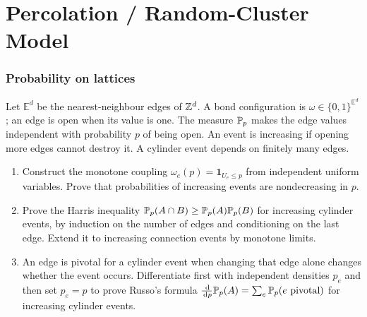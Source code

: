\part{Percolation / Random-Cluster Model}

\section{Probability on lattices}

\begin{exercise}
Let $\mathbb E^d$ be the nearest-neighbour edges of $\mathbb Z^d$.
A bond configuration is $\omega\in\{0,1\}^{\mathbb E^d}$;
an edge is open when its value is one. The measure $\mathbb P_p$
makes the edge values independent with probability $p$ of
being open. An event is increasing if opening more edges
cannot destroy it. A cylinder event depends on finitely many
edges.
\begin{enumerate}[label=(\alph*)]
\item Construct the monotone coupling
$\omega_e(p)=\mathbf1_{U_e\le p}$ from independent uniform
variables. Prove that probabilities of increasing events
are nondecreasing in $p$.
\item Prove the Harris inequality
$\mathbb P_p(A\cap B)\ge\mathbb P_p(A)\mathbb P_p(B)$ for increasing
cylinder events, by induction on the number of edges and
conditioning on the last edge. Extend it to increasing
connection events by monotone limits.
\item An edge is pivotal for a cylinder event when changing
that edge alone changes whether the event occurs.
Differentiate first with independent densities $p_e$ and
then set $p_e=p$ to prove Russo's formula
$\frac{\,\mathrm d}{\,\mathrm d p}\mathbb P_p(A)=\sum_e\mathbb P_p(e\text{ pivotal})$
for increasing cylinder events.
\end{enumerate}
\end{exercise}

